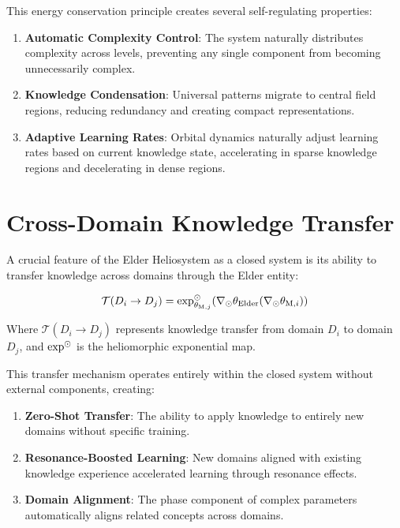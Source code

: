 This energy conservation principle creates several self-regulating properties:

\begin{enumerate}
    \item \textbf{Automatic Complexity Control}: The system naturally distributes complexity across levels, preventing any single component from becoming unnecessarily complex.
    
    \item \textbf{Knowledge Condensation}: Universal patterns migrate to central field regions, reducing redundancy and creating compact representations.
    
    \item \textbf{Adaptive Learning Rates}: Orbital dynamics naturally adjust learning rates based on current knowledge state, accelerating in sparse knowledge regions and decelerating in dense regions.
\end{enumerate}

\section{Cross-Domain Knowledge Transfer}

A crucial feature of the Elder Heliosystem as a closed system is its ability to transfer knowledge across domains through the Elder entity:

\begin{equation}
\mathcal{T}(D_i \rightarrow D_j) = \exp^{\odot}_{\theta_{\text{M},j}}(\nabla_{\odot} \theta_{\text{Elder}}(\nabla_{\odot} \theta_{\text{M},i}))
\end{equation}

Where $\mathcal{T}(D_i \rightarrow D_j)$ represents knowledge transfer from domain $D_i$ to domain $D_j$, and $\exp^{\odot}$ is the heliomorphic exponential map.

This transfer mechanism operates entirely within the closed system without external components, creating:

\begin{enumerate}
    \item \textbf{Zero-Shot Transfer}: The ability to apply knowledge to entirely new domains without specific training.
    
    \item \textbf{Resonance-Boosted Learning}: New domains aligned with existing knowledge experience accelerated learning through resonance effects.
    
    \item \textbf{Domain Alignment}: The phase component of complex parameters automatically aligns related concepts across domains.
\end{enumerate}

